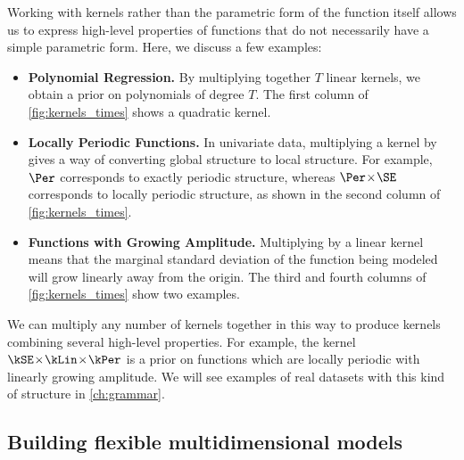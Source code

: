 Working with kernels rather than the parametric form of the function itself allows us to express high-level properties of functions that do not necessarily have a simple parametric form.
Here, we discuss a few examples:

\begin{itemize}
\item {\bf Polynomial Regression.}
By multiplying together $T$ linear kernels, we obtain a prior on polynomials of degree $T$.
The first column of \cref{fig:kernels_times} shows a quadratic kernel.

\item {\bf Locally Periodic Functions.}
In univariate data, multiplying a kernel by \kSE{} gives a way of converting global structure to local structure.
For example, $\Per$ corresponds to exactly periodic structure, whereas $\Per \kerntimes \SE$ corresponds to locally periodic structure, as shown in the second column of \cref{fig:kernels_times}.

\item {\bf Functions with Growing Amplitude.}
Multiplying by a linear kernel means that the marginal standard deviation of the function being modeled will grow linearly away from the origin.
The third and fourth columns of \cref{fig:kernels_times} show two examples.
\end{itemize}

We can multiply any number of kernels together in this way to produce kernels combining several high-level properties.
For example, the kernel $\kSE \kerntimes \kLin \kerntimes \kPer$ is a prior on functions which are locally periodic with linearly growing amplitude.
We will see examples of real datasets with this kind of structure in \cref{ch:grammar}.


\subsection{Building flexible multidimensional models}


